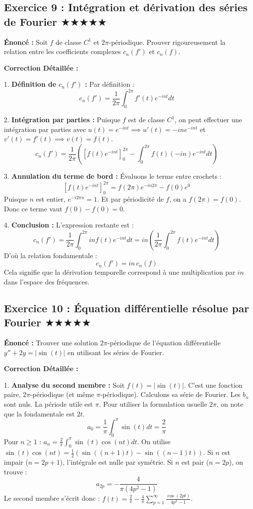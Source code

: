 \documentclass[11pt,a4paper]{article}
\begin{document}
\subsection*{Exercice 9 : Intégration et dérivation des séries de Fourier \quad $\bigstar\bigstar\bigstar\bigstar\bigstar$}

\textbf{Énoncé :}
Soit $f$ de classe $C^1$ et $2\pi$-périodique. Prouver rigoureusement la relation entre les coefficients complexes $c_n(f')$ et $c_n(f)$.

\textbf{Correction Détaillée :}

1. \textbf{Définition de $c_n(f')$ :}
   Par définition :
   $$ c_n(f') = \frac{1}{2\pi} \int_0^{2\pi} f'(t) e^{-int} dt $$

2. \textbf{Intégration par parties :}
   Puisque $f$ est de classe $C^1$, on peut effectuer une intégration par parties avec $u(t) = e^{-int} \implies u'(t) = -in e^{-int}$ et $v'(t) = f'(t) \implies v(t) = f(t)$.
   $$ c_n(f') = \frac{1}{2\pi} \left( \left[ f(t) e^{-int} \right]_0^{2\pi} - \int_0^{2\pi} f(t) (-in) e^{-int} dt \right) $$

3. \textbf{Annulation du terme de bord :}
   Évaluons le terme entre crochets :
   $$ \left[ f(t) e^{-int} \right]_0^{2\pi} = f(2\pi) e^{-in2\pi} - f(0) e^0 $$
   Puisque $n$ est entier, $e^{-i2\pi n} = 1$. Et par périodicité de $f$, on a $f(2\pi) = f(0)$.
   Donc ce terme vaut $f(0) - f(0) = 0$.

4. \textbf{Conclusion :}
   L'expression restante est :
   $$ c_n(f') = \frac{1}{2\pi} \int_0^{2\pi} in f(t) e^{-int} dt = in \left( \frac{1}{2\pi} \int_0^{2\pi} f(t) e^{-int} dt \right) $$
   D'où la relation fondamentale :
   $$ c_n(f') = in \, c_n(f) $$
   Cela signifie que la dérivation temporelle correspond à une multiplication par $in$ dans l'espace des fréquences.


\subsection*{Exercice 10 : Équation différentielle résolue par Fourier \quad $\bigstar\bigstar\bigstar\bigstar\bigstar$}

\textbf{Énoncé :}
Trouver une solution $2\pi$-périodique de l'équation différentielle $y'' + 2y = |\sin(t)|$ en utilisant les séries de Fourier.

\textbf{Correction Détaillée :}

1. \textbf{Analyse du second membre :}
   Soit $f(t) = |\sin(t)|$. C'est une fonction paire, $2\pi$-périodique (et même $\pi$-périodique).
   Calculons sa série de Fourier. Les $b_n$ sont nuls.
   La période utile est $\pi$. Pour utiliser la formulation usuelle $2\pi$, on note que la fondamentale est $2t$.
   $$ a_0 = \frac{1}{\pi} \int_0^\pi \sin(t) dt = \frac{2}{\pi} $$
   Pour $n \ge 1$ : $a_n = \frac{2}{\pi} \int_0^\pi \sin(t) \cos(nt) dt$.
   On utilise $\sin(t)\cos(nt) = \frac{1}{2}(\sin((n+1)t) - \sin((n-1)t))$.
   Si $n$ est impair ($n=2p+1$), l'intégrale est nulle par symétrie.
   Si $n$ est pair ($n=2p$), on trouve :
   $$ a_{2p} = -\frac{4}{\pi(4p^2 - 1)} $$
   Le second membre s'écrit donc : $f(t) = \frac{2}{\pi} - \frac{4}{\pi} \sum_{p=1}^\infty \frac{\cos(2pt)}{4p^2 - 1}$.
\end{document}
